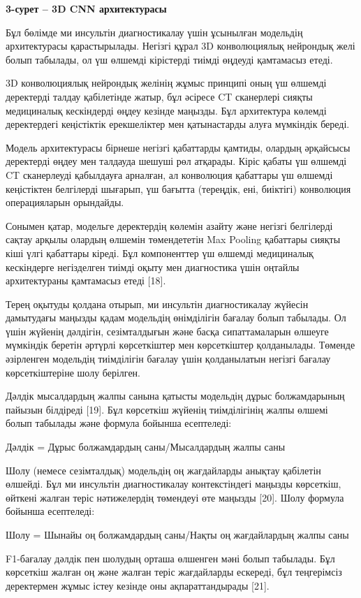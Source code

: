 \textbf{3-сурет -- 3D CNN архитектурасы}

Бұл бөлімде ми инсультін диагностикалау үшін ұсынылған модельдің
архитектурасы қарастырылады. Негізгі құрал 3D конволюциялық нейрондық
желі болып табылады, ол үш өлшемді кірістерді тиімді өңдеуді қамтамасыз
етеді.

3D конволюциялық нейрондық желінің жұмыс принципі оның үш өлшемді
деректерді талдау қабілетінде жатыр, бұл әсіресе CT сканерлері сияқты
медициналық кескіндерді өңдеу кезінде маңызды. Бұл архитектура көлемді
деректердегі кеңістіктік ерекшеліктер мен қатынастарды алуға мүмкіндік
береді.

Модель архитектурасы бірнеше негізгі қабаттарды қамтиды, олардың
әрқайсысы деректерді өңдеу мен талдауда шешуші рөл атқарады. Кіріс
қабаты үш өлшемді CT сканерлеуді қабылдауға арналған, ал конволюция
қабаттары үш өлшемді кеңістіктен белгілерді шығарып, үш бағытта
(тереңдік, ені, биіктігі) конволюция операцияларын орындайды.

Сонымен қатар, модельге деректердің көлемін азайту және негізгі
белгілерді сақтау арқылы олардың өлшемін төмендететін Max Pooling
қабаттары сияқты кіші үлгі қабаттары кіреді. Бұл компоненттер үш өлшемді
медициналық кескіндерге негізделген тиімді оқыту мен диагностика үшін
оңтайлы архитектураны қамтамасыз етеді {[}18{]}.

Терең оқытуды қолдана отырып, ми инсультін диагностикалау жүйесін
дамытудағы маңызды қадам модельдің өнімділігін бағалау болып табылады.
Ол үшін жүйенің дәлдігін, сезімталдығын және басқа сипаттамаларын
өлшеуге мүмкіндік беретін әртүрлі көрсеткіштер мен көрсеткіштер
қолданылады. Төменде әзірленген модельдің тиімділігін бағалау үшін
қолданылатын негізгі бағалау көрсеткіштеріне шолу берілген.

Дәлдік мысалдардың жалпы санына қатысты модельдің дұрыс болжамдарының
пайызын білдіреді {[}19{]}. Бұл көрсеткіш жүйенің тиімділігінің жалпы
өлшемі болып табылады және формула бойынша есептеледі:

Дәлдік = Дұрыс болжамдардың саны/Мысалдардың жалпы саны

Шолу (немесе сезімталдық) модельдің оң жағдайларды анықтау қабілетін
өлшейді. Бұл ми инсультін диагностикалау контекстіндегі маңызды
көрсеткіш, өйткені жалған теріс нәтижелердің төмендеуі өте маңызды
{[}20{]}. Шолу формула бойынша есептеледі:

Шолу = Шынайы оң болжамдардың саны/Нақты оң жағдайлардың жалпы саны

F1-бағалау дәлдік пен шолудың орташа өлшенген мәні болып табылады. Бұл
көрсеткіш жалған оң және жалған теріс жағдайларды ескереді, бұл
теңгерімсіз деректермен жұмыс істеу кезінде оны ақпараттандырады
{[}21{]}.

